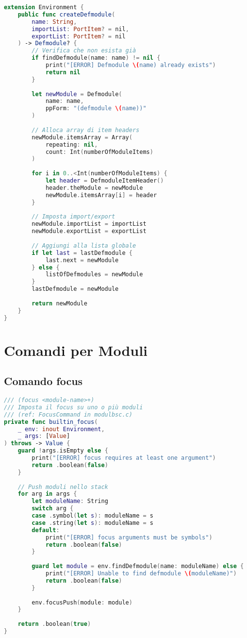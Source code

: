 \begin{lstlisting}[language=Swift]
extension Environment {
    public func createDefmodule(
        name: String,
        importList: PortItem? = nil,
        exportList: PortItem? = nil
    ) -> Defmodule? {
        // Verifica che non esista già
        if findDefmodule(name: name) != nil {
            print("[ERROR] Defmodule \(name) already exists")
            return nil
        }
        
        let newModule = Defmodule(
            name: name,
            ppForm: "(defmodule \(name))"
        )
        
        // Alloca array di item headers
        newModule.itemsArray = Array(
            repeating: nil,
            count: Int(numberOfModuleItems)
        )
        
        for i in 0..<Int(numberOfModuleItems) {
            let header = DefmoduleItemHeader()
            header.theModule = newModule
            newModule.itemsArray[i] = header
        }
        
        // Imposta import/export
        newModule.importList = importList
        newModule.exportList = exportList
        
        // Aggiungi alla lista globale
        if let last = lastDefmodule {
            last.next = newModule
        } else {
            listOfDefmodules = newModule
        }
        lastDefmodule = newModule
        
        return newModule
    }
}
\end{lstlisting}

\section{Comandi per Moduli}

\subsection{Comando focus}

\begin{lstlisting}[language=Swift]
/// (focus <module-name>+)
/// Imposta il focus su uno o più moduli
/// (ref: FocusCommand in modulbsc.c)
private func builtin_focus(
    _ env: inout Environment,
    _ args: [Value]
) throws -> Value {
    guard !args.isEmpty else {
        print("[ERROR] focus requires at least one argument")
        return .boolean(false)
    }
    
    // Push moduli nello stack
    for arg in args {
        let moduleName: String
        switch arg {
        case .symbol(let s): moduleName = s
        case .string(let s): moduleName = s
        default:
            print("[ERROR] focus arguments must be symbols")
            return .boolean(false)
        }
        
        guard let module = env.findDefmodule(name: moduleName) else {
            print("[ERROR] Unable to find defmodule \(moduleName)")
            return .boolean(false)
        }
        
        env.focusPush(module: module)
    }
    
    return .boolean(true)
}
\end{lstlisting}

